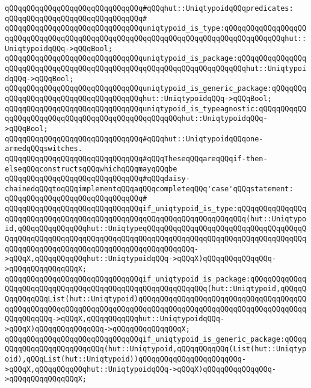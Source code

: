\verb|qQQqqQQqqQQqqQQqqQQqqQQqqQQqqQQq#qQQqhut::UniqtypoidqQQqpredicates:|\newline
\verb|qQQqqQQqqQQqqQQqqQQqqQQqqQQqqQQq#|\newline
\verb|qQQqqQQqqQQqqQQqqQQqqQQqqQQqqQQquniqtypoid_is_type:qQQqqQQqqQQqqQQqqQQqqQQqqQQqqQQqqQQqqQQqqQQqqQQqqQQqqQQqqQQqqQQqqQQqqQQqqQQqqQQqqQQqhut::UniqtypoidqQQq->qQQqBool;|\newline
\verb|qQQqqQQqqQQqqQQqqQQqqQQqqQQqqQQquniqtypoid_is_package:qQQqqQQqqQQqqQQqqQQqqQQqqQQqqQQqqQQqqQQqqQQqqQQqqQQqqQQqqQQqqQQqqQQqqQQqhut::UniqtypoidqQQq->qQQqBool;|\newline
\verb|qQQqqQQqqQQqqQQqqQQqqQQqqQQqqQQquniqtypoid_is_generic_package:qQQqqQQqqQQqqQQqqQQqqQQqqQQqqQQqqQQqqQQqhut::UniqtypoidqQQq->qQQqBool;|\newline
\verb|qQQqqQQqqQQqqQQqqQQqqQQqqQQqqQQquniqtypoid_is_typeagnostic:qQQqqQQqqQQqqQQqqQQqqQQqqQQqqQQqqQQqqQQqqQQqqQQqqQQqhut::UniqtypoidqQQq->qQQqBool;|\newline
\newline
\verb|qQQqqQQqqQQqqQQqqQQqqQQqqQQqqQQq#qQQqhut::UniqtypoidqQQqone-armedqQQqswitches.|\newline
\verb|qQQqqQQqqQQqqQQqqQQqqQQqqQQqqQQq#qQQqTheseqQQqareqQQqif-then-elseqQQqconstructsqQQqwhichqQQqmayqQQqbe|\newline
\verb|qQQqqQQqqQQqqQQqqQQqqQQqqQQqqQQq#qQQqdaisy-chainedqQQqtoqQQqimplementqQQqaqQQqcompleteqQQq'case'qQQqstatement:|\newline
\verb|qQQqqQQqqQQqqQQqqQQqqQQqqQQqqQQq#|\newline
\verb|qQQqqQQqqQQqqQQqqQQqqQQqqQQqqQQqif_uniqtypoid_is_type:qQQqqQQqqQQqqQQqqQQqqQQqqQQqqQQqqQQqqQQqqQQqqQQqqQQqqQQqqQQqqQQqqQQqqQQq(hut::Uniqtypoid,qQQqqQQqqQQqqQQqhut::UniqtypeqQQqqQQqqQQqqQQqqQQqqQQqqQQqqQQqqQQqqQQqqQQqqQQqqQQqqQQqqQQqqQQqqQQqqQQqqQQqqQQqqQQqqQQqqQQqqQQqqQQqqQQqqQQqqQQqqQQqqQQqqQQqqQQqqQQqqQQqqQQqqQQqqQQqqQQq->qQQqX,qQQqqQQqqQQqhut::UniqtypoidqQQq->qQQqX)qQQqqQQqqQQqqQQq->qQQqqQQqqQQqqQQqX;|\newline
\verb|qQQqqQQqqQQqqQQqqQQqqQQqqQQqqQQqif_uniqtypoid_is_package:qQQqqQQqqQQqqQQqqQQqqQQqqQQqqQQqqQQqqQQqqQQqqQQqqQQqqQQqqQQq(hut::Uniqtypoid,qQQqqQQqqQQqqQQqList(hut::Uniqtypoid)qQQqqQQqqQQqqQQqqQQqqQQqqQQqqQQqqQQqqQQqqQQqqQQqqQQqqQQqqQQqqQQqqQQqqQQqqQQqqQQqqQQqqQQqqQQqqQQqqQQqqQQqqQQqqQQqqQQqqQQq->qQQqX,qQQqqQQqqQQqhut::UniqtypoidqQQq->qQQqX)qQQqqQQqqQQqqQQq->qQQqqQQqqQQqqQQqX;|\newline
\verb|qQQqqQQqqQQqqQQqqQQqqQQqqQQqqQQqif_uniqtypoid_is_generic_package:qQQqqQQqqQQqqQQqqQQqqQQqqQQq(hut::Uniqtypoid,qQQqqQQqqQQq(List(hut::Uniqtypoid),qQQqList(hut::Uniqtypoid))qQQqqQQqqQQqqQQqqQQqqQQq->qQQqX,qQQqqQQqqQQqhut::UniqtypoidqQQq->qQQqX)qQQqqQQqqQQqqQQq->qQQqqQQqqQQqqQQqX;|\newline

